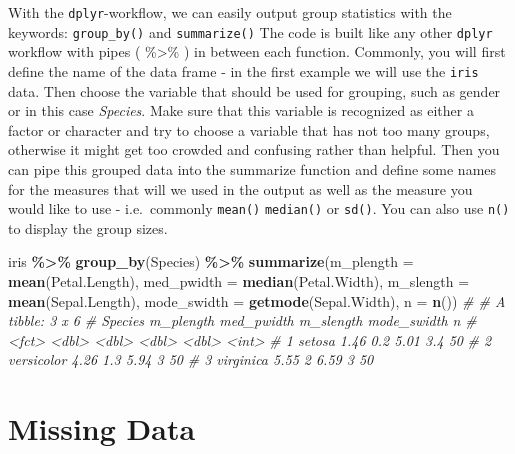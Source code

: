 \documentclass[
]{book}
\newenvironment{Shaded}{\begin{snugshade}}{\end{snugshade}}
\newcommand{\AttributeTok}[1]{\textcolor[rgb]{0.13,0.29,0.53}{#1}}
\newcommand{\CommentTok}[1]{\textcolor[rgb]{0.56,0.35,0.01}{\textit{#1}}}
\newcommand{\FunctionTok}[1]{\textcolor[rgb]{0.13,0.29,0.53}{\textbf{#1}}}
\newcommand{\NormalTok}[1]{#1}
\newcommand{\SpecialCharTok}[1]{\textcolor[rgb]{0.81,0.36,0.00}{\textbf{#1}}}
\begin{document}
With the \texttt{dplyr}-workflow, we can easily output group statistics with the keywords: \texttt{group\_by()} and \texttt{summarize()}
The code is built like any other \texttt{dplyr} workflow with pipes ( \%\textgreater\% ) in between each function.
Commonly, you will first define the name of the data frame - in the first example we will use the \texttt{iris} data.
Then choose the variable that should be used for grouping, such as gender or in this case \emph{Species}.
Make sure that this variable is recognized as either a factor or character and try to choose a variable that has not too many groups, otherwise it might get too crowded and confusing rather than helpful.
Then you can pipe this grouped data into the summarize function and define some names for the measures that will we used in the output as well as the measure you would like to use - i.e.~commonly \texttt{mean()} \texttt{median()} or \texttt{sd()}.
You can also use \texttt{n()} to display the group sizes.

\begin{Shaded}
\begin{Highlighting}[]
\NormalTok{iris }\SpecialCharTok{\%\textgreater{}\%} 
  \FunctionTok{group\_by}\NormalTok{(Species) }\SpecialCharTok{\%\textgreater{}\%} 
  \FunctionTok{summarize}\NormalTok{(}\AttributeTok{m\_plength =} \FunctionTok{mean}\NormalTok{(Petal.Length),}
            \AttributeTok{med\_pwidth =} \FunctionTok{median}\NormalTok{(Petal.Width),}
            \AttributeTok{m\_slength =} \FunctionTok{mean}\NormalTok{(Sepal.Length),}
            \AttributeTok{mode\_swidth =} \FunctionTok{getmode}\NormalTok{(Sepal.Width),}
            \AttributeTok{n =} \FunctionTok{n}\NormalTok{())}
\CommentTok{\# \# A tibble: 3 x 6}
\CommentTok{\#   Species    m\_plength med\_pwidth m\_slength mode\_swidth     n}
\CommentTok{\#   \textless{}fct\textgreater{}          \textless{}dbl\textgreater{}      \textless{}dbl\textgreater{}     \textless{}dbl\textgreater{}       \textless{}dbl\textgreater{} \textless{}int\textgreater{}}
\CommentTok{\# 1 setosa          1.46        0.2      5.01         3.4    50}
\CommentTok{\# 2 versicolor      4.26        1.3      5.94         3      50}
\CommentTok{\# 3 virginica       5.55        2        6.59         3      50}
\end{Highlighting}
\end{Shaded}

\section{Missing Data}\label{missing-data}
\end{document}
